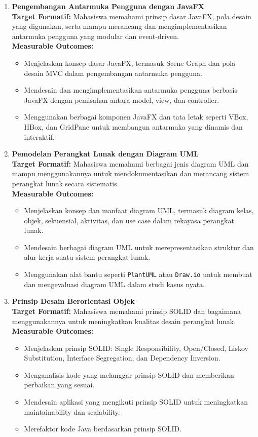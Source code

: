 \begin{enumerate}
	\item \textbf{Pengembangan Antarmuka Pengguna dengan JavaFX}  \\
	\textbf{Target Formatif:} Mahasiswa memahami prinsip dasar JavaFX, pola desain yang digunakan, serta mampu merancang dan mengimplementasikan antarmuka pengguna yang modular dan event-driven.  \\
	\textbf{Measurable Outcomes:}
	\begin{itemize}
		\item Menjelaskan konsep dasar JavaFX, termasuk Scene Graph dan pola desain MVC dalam pengembangan antarmuka pengguna.
		\item Mendesain dan mengimplementasikan antarmuka pengguna berbasis JavaFX dengan pemisahan antara model, view, dan controller.
		\item Menggunakan berbagai komponen JavaFX dan tata letak seperti VBox, HBox, dan GridPane untuk membangun antarmuka yang dinamis dan interaktif.
	\end{itemize}
	
	
	\item \textbf{Pemodelan Perangkat Lunak dengan Diagram UML}  \\
	\textbf{Target Formatif:} Mahasiswa memahami berbagai jenis diagram UML dan mampu menggunakannya untuk mendokumentasikan dan merancang sistem perangkat lunak secara sistematis.  \\
	\textbf{Measurable Outcomes:}
	\begin{itemize}
		\item Menjelaskan konsep dan manfaat diagram UML, termasuk diagram kelas, objek, sekuensial, aktivitas, dan use case dalam rekayasa perangkat lunak.
		\item Mendesain berbagai diagram UML untuk merepresentasikan struktur dan alur kerja suatu sistem perangkat lunak.
		\item Menggunakan alat bantu seperti \texttt{PlantUML} atau \texttt{Draw.io} untuk membuat dan mengevaluasi diagram UML dalam studi kasus nyata.
	\end{itemize}
	
	
	\item \textbf{Prinsip Desain Berorientasi Objek}  \\
	\textbf{Target Formatif:} Mahasiswa memahami prinsip SOLID dan bagaimana menggunakannya untuk meningkatkan kualitas desain perangkat lunak.  \\
	\textbf{Measurable Outcomes:}
	\begin{itemize}
		\item Menjelaskan prinsip SOLID: Single Responsibility, Open/Closed, Liskov Substitution, Interface Segregation, dan Dependency Inversion.
		\item Menganalisis kode yang melanggar prinsip SOLID dan memberikan perbaikan yang sesuai.
		\item Mendesain aplikasi yang mengikuti prinsip SOLID untuk meningkatkan maintainability dan scalability.
		\item Merefaktor kode Java berdasarkan prinsip SOLID.
	\end{itemize}
	

\end{enumerate}
